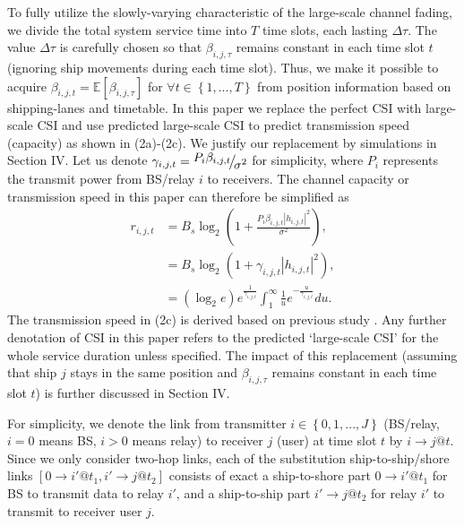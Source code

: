 \documentclass[conference]{IEEEtran}
\begin{document}
 To fully utilize the slowly-varying characteristic of the large-scale channel fading, we divide the total system service time into $T$ time slots, each lasting $\Delta \tau$. The value $\Delta \tau$ is carefully chosen so that $\beta _{i,j,\tau }$ remains constant in each time slot $t$ (ignoring ship movements during each time slot). Thus, we make it possible to acquire $\beta _{i,j,t} = \mathbb{E} \left [ {\beta _{i,j,\tau }} \right ]$ for $\forall t \in \left\{ {1,...,T} \right\}$ from position information based on shipping-lanes and timetable. 
 In this paper we replace the perfect CSI with large-scale CSI and use predicted large-scale CSI to predict transmission speed (capacity) as shown in (2a)-(2c). We justify our replacement by simulations in Section IV. Let us denote ${\gamma _{i,j,t }} = {\raise0.7ex\hbox{${{P_{i} }{\beta _{i,j,t }}}$} \!\mathord{\left/
  {\vphantom {{{P_{i} }{\beta _{i,j,t }}} {{\sigma ^2}}}}\right.\kern-\nulldelimiterspace}
 \!\lower0.7ex\hbox{${{\sigma ^2}}$}}$ for simplicity, where ${P_{i}}$ represents the transmit power from BS/relay $i$ to receivers. The channel capacity or transmission speed in this paper can therefore be simplified as
 \begin{subequations}
 \begin{align}
 {r_{i,j,t}} & = {{B_s}{{\log }_2}\left( {1 + \frac{{{P_{i} }{\beta _{i,j,t }}{{\left| {{h_{i,j,t }}} \right|}^2}}}{{{\sigma ^2}}}} \right)},\\
 & = {B_s}{\log }_2 \left( {1 + {\gamma _{i,j,t }}{{\left| {{h_{i,j,t }}} \right|}^2}} \right),\\
 & = \left( {{{\log }_2}e} \right){e^{\frac{1}{{{\gamma _{i,j,t }}}}}}\int_1^\infty {\frac{1}{u}{e^{ - \frac{u}{{{\gamma _{i,j,t }}}}}}du} .
 \end{align}
 \end{subequations}
 The transmission speed in (2c) is derived based on previous study \cite{p41}. Any further denotation of CSI in this paper refers to the predicted `large-scale CSI' for the whole service duration unless specified. The impact of this replacement (assuming that ship $j$ stays in the same position and $\beta _{i,j,\tau }$ remains constant in each time slot $t$) is further discussed in Section IV. 

 For simplicity, we denote the link from transmitter $i \in \left\{ {0,1,...,J} \right\}$ (BS/relay, $i = 0$ means BS, $i > 0$ means relay) to receiver $j$ (user) at time slot $t$ by $i \to j@t$. Since we only consider two-hop links, each of the substitution ship-to-ship/shore links $\left[ {0 \to i'@{t_1},i' \to j@{t_2}} \right]$ consists of exact a ship-to-shore part $0 \to i'@{t_1}$ for BS to transmit data to relay ${i'}$, and a ship-to-ship part $i' \to j@{t_2}$ for relay ${i'}$ to transmit to receiver user $j$. 
 
\end{document}
